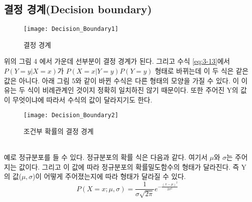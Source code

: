 \documentclass[a4paper]{oblivoir}
\begin{document}
\subsection{결정 경계(Decision boundary)}
\begin{figure}[ht]\centering
\texttt{[image: Decision\_Boundary1]}\caption{결정 경계}\label{Fig:3-4}
\end{figure}
\indent 위의 그림 4 에서 가운데 선부분이 결정 경계가 된다. 그리고 수식 \eqref{eq:3-13}에서 $P(Y=y|X=x)$가 $P(X=x|Y=y)P(Y=y)$ 형태로 바뀌는데 이 두 식은 같은 값은 아니다. 아래 그림 5와 같이 바뀐 수식은 다른 형태의 모양을 가질 수 있다. 이 이유는 두 식이 비례관계인 것이지 정확히 일치하진 않기 때문이다. 또한 주어진 Y의 값이 무엇이냐에 따라서 수식의 값이 달라지기도 한다.
\begin{figure}[ht]\centering
\texttt{[image: Decision\_Boundary2]}\caption{조건부 확률의 결정 경계}\label{Fig:3-5}
\end{figure}\\
\indent 예로 정규분포를 들 수 있다. 정규분포의 확률 식은 다음과 같다. 여기서 $\mu$와 $\sigma$는 주어지는 값이다. 그리고 이 값에 따라 정규분포의 확률밀도함수의 형태가 달라진다. 즉 Y의 값($\mu,\sigma$)이 어떻게 주어졌는지에 따라 형태가 달라질 수 있다.
$$P(X=x;\mu ,\sigma)=\frac{1}{\sigma\sqrt{2\pi}}e^{-\frac{(x-\mu)^2}{2\sigma^2}}$$
\end{document}
